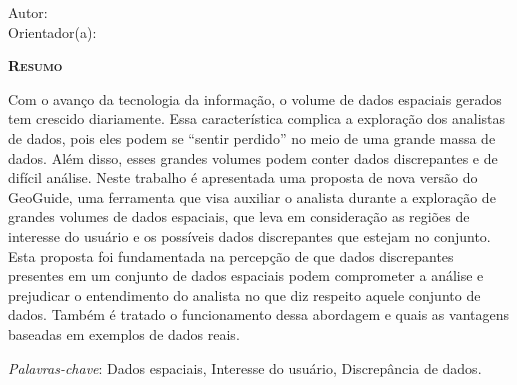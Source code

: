 \begin{center}
	{\Large{\textbf{\thesistitle}}}
\end{center}

\vspace{1cm}

\begin{flushright}
	Autor: \thesisauthor\\
	Orientador(a): \thesissupervisor
\end{flushright}

\vspace{1cm}

\begin{center}
	\Large{\textsc{\textbf{Resumo}}}
\end{center}

\noindent Com o avanço da tecnologia da informação, o volume de dados espaciais gerados tem crescido diariamente. Essa característica complica a exploração dos analistas de dados, pois eles podem se ``sentir perdido'' no meio de uma grande massa de dados. Além disso, esses grandes volumes podem conter dados discrepantes e de difícil análise. Neste trabalho é apresentada uma proposta de nova versão do GeoGuide, uma ferramenta que visa auxiliar o analista durante a exploração de grandes volumes de dados espaciais, que leva em consideração as regiões de interesse do usuário e os possíveis dados discrepantes que estejam no conjunto. Esta proposta foi fundamentada na percepção de que dados discrepantes presentes em um conjunto de dados espaciais podem comprometer a análise e prejudicar o entendimento do analista no que diz respeito aquele conjunto de dados. Também é tratado o funcionamento dessa abordagem e quais as vantagens baseadas em exemplos de dados reais.

\noindent\textit{Palavras-chave}: Dados espaciais, Interesse do usuário, Discrepância de dados.